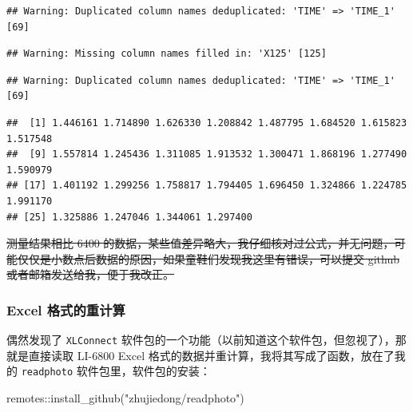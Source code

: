 \documentclass[
]{krantz}
\makeatletter
\newenvironment{Shaded}{\begin{snugshade}}{\end{snugshade}}
\newcommand{\FunctionTok}[1]{\textcolor[rgb]{0.00,0.00,0.00}{#1}}
\newcommand{\NormalTok}[1]{#1}
\newcommand{\SpecialCharTok}[1]{\textcolor[rgb]{0.00,0.00,0.00}{#1}}
\newcommand{\StringTok}[1]{\textcolor[rgb]{0.31,0.60,0.02}{#1}}
\newenvironment{kframe}{%
\medskip{}
\setlength{\fboxsep}{.8em}
 \def\at@end@of@kframe{}%
 \ifinner\ifhmode%
  \def\at@end@of@kframe{\end{minipage}}%
  \begin{minipage}{\columnwidth}%
 \fi\fi%
 \def\FrameCommand##1{\hskip\@totalleftmargin \hskip-\fboxsep
 \colorbox{shadecolor}{##1}\hskip-\fboxsep
     \hskip-\linewidth \hskip-\@totalleftmargin \hskip\columnwidth}%
 \MakeFramed {\advance\hsize-\width
   \@totalleftmargin\z@ \linewidth\hsize
   \@setminipage}}%
 {\par\unskip\endMakeFramed%
 \at@end@of@kframe}
\renewenvironment{Shaded}{\begin{kframe}}{\end{kframe}}
\makeatother
\begin{document}
\begin{verbatim}
## Warning: Duplicated column names deduplicated: 'TIME' => 'TIME_1' [69]
\end{verbatim}

\begin{verbatim}
## Warning: Missing column names filled in: 'X125' [125]
\end{verbatim}

\begin{verbatim}
## Warning: Duplicated column names deduplicated: 'TIME' => 'TIME_1' [69]
\end{verbatim}

\begin{Shaded}
\end{Shaded}

\begin{verbatim}
##  [1] 1.446161 1.714890 1.626330 1.208842 1.487795 1.684520 1.615823 1.517548
##  [9] 1.557814 1.245436 1.311085 1.913532 1.300471 1.868196 1.277490 1.590979
## [17] 1.401192 1.299256 1.758817 1.794405 1.696450 1.324866 1.224785 1.991170
## [25] 1.325886 1.247046 1.344061 1.297400
\end{verbatim}

\sout{测量结果相比 6400 的数据，某些值差异略大，我仔细核对过公式，并无问题，可能仅仅是小数点后数据的原因，如果童鞋们发现我这里有错误，可以提交 github 或者邮箱发送给我，便于我改正。}

\hypertarget{excel-recompute-68}{%
\subsubsection{Excel 格式的重计算}\label{excel-recompute-68}}

偶然发现了 \texttt{XLConnect} 软件包的一个功能（以前知道这个软件包，但忽视了），那就是直接读取 LI-6800 Excel 格式的数据并重计算，我将其写成了函数，放在了我的 \texttt{readphoto} 软件包里，软件包的安装：

\begin{Shaded}
\begin{Highlighting}[]
\NormalTok{remotes}\SpecialCharTok{::}\FunctionTok{install\_github}\NormalTok{(}\StringTok{"zhujiedong/readphoto"}\NormalTok{)}
\end{Highlighting}
\end{Shaded}
\end{document}
